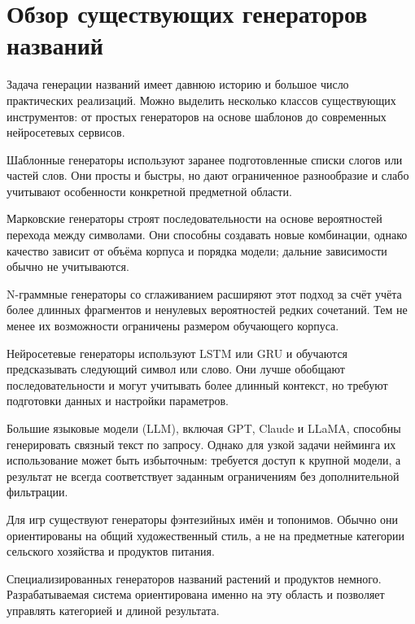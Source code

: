 \section{Обзор существующих генераторов названий}\label{ux43eux431ux437ux43eux440-ux441ux443ux449ux435ux441ux442ux432ux443ux44eux449ux438ux445-ux433ux435ux43dux435ux440ux430ux442ux43eux440ux43eux432-ux43dux430ux437ux432ux430ux43dux438ux439}

Задача генерации названий имеет давнюю историю и большое число практических реализаций. Можно выделить несколько классов существующих инструментов: от простых генераторов на основе шаблонов до современных нейросетевых сервисов.

Шаблонные генераторы используют заранее подготовленные списки слогов или частей слов. Они просты и быстры, но дают ограниченное разнообразие и слабо учитывают особенности конкретной предметной области.

Марковские генераторы строят последовательности на основе вероятностей перехода между символами. Они способны создавать новые комбинации, однако качество зависит от объёма корпуса и порядка модели; дальние зависимости обычно не учитываются.

N-граммные генераторы со сглаживанием расширяют этот подход за счёт учёта более длинных фрагментов и ненулевых вероятностей редких сочетаний. Тем не менее их возможности ограничены размером обучающего корпуса.

Нейросетевые генераторы используют LSTM или GRU и обучаются предсказывать следующий символ или слово. Они лучше обобщают последовательности и могут учитывать более длинный контекст, но требуют подготовки данных и настройки параметров.

Большие языковые модели (LLM), включая GPT, Claude и LLaMA, способны генерировать связный текст по запросу. Однако для узкой задачи нейминга их использование может быть избыточным: требуется доступ к крупной модели, а результат не всегда соответствует заданным ограничениям без дополнительной фильтрации.

Для игр существуют генераторы фэнтезийных имён и топонимов. Обычно они ориентированы на общий художественный стиль, а не на предметные категории сельского хозяйства и продуктов питания.

Специализированных генераторов названий растений и продуктов немного. Разрабатываемая система ориентирована именно на эту область и позволяет управлять категорией и длиной результата.
